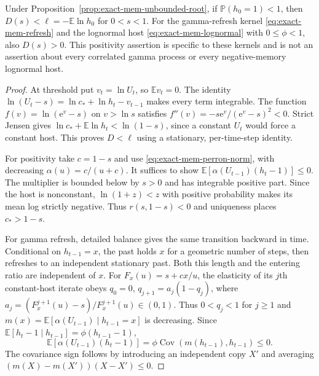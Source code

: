 \begin{proposition}
\label{prop:exact-mem-unbounded-bounds}
Under Proposition~\ref{prop:exact-mem-unbounded-root}, if
$\mathbb P(h_0=1)<1$, then $D(s)<\ell=-\mathbb E\ln h_0$ for
$0<s<1$. For the gamma-refresh kernel \eqref{eq:exact-mem-refresh}
and the lognormal host \eqref{eq:exact-mem-lognormal} with
$0\leq\phi<1$, also $D(s)>0$. This positivity assertion is specific
to these kernels and is not an assertion about every correlated
gamma process or every negative-memory lognormal host.
\end{proposition}

\begin{proof}
At threshold put $v_t=\ln U_t$, so $\mathbb E v_t=0$. The identity
$\ln(U_t-s)=\ln c_*+\ln h_t-v_{t-1}$ makes every term integrable.
The function $f(v)=\ln(\mathrm e^v-s)$ on $v>\ln s$ satisfies
$f''(v)=-s\mathrm e^v/(\mathrm e^v-s)^2<0$.
Strict Jensen gives $\ln c_*+\mathbb E\ln h_t<\ln(1-s)$,
since a constant $U_t$ would force a constant host. This proves
$D<\ell$ using a stationary, per-time-step identity.

For positivity take $c=1-s$ and use
\eqref{eq:exact-mem-perron-norm}, with decreasing
$\alpha(u)=c/(u+c)$. It suffices to show
$\mathbb E[\alpha(U_{t-1})(h_t-1)]\leq0$.
The multiplier is bounded below by $s>0$ and has integrable positive
part. Since the host is nonconstant, $\ln(1+z)<z$ with positive
probability makes its mean log strictly negative. Thus
$r(s,1-s)<0$ and uniqueness places $c_*>1-s$.

For gamma refresh, detailed balance gives the same transition
backward in time. Conditional on $h_{t-1}=x$, the past holds $x$
for a geometric number of steps, then refreshes to an independent
stationary past. Both this length and the entering ratio are
independent of $x$. For $F_x(u)=s+cx/u$, the elasticity of its
$j$th constant-host iterate obeys
$q_0=0$, $q_{j+1}=a_j(1-q_j)$, where
$a_j=(F_x^{j+1}(u)-s)/F_x^{j+1}(u)\in(0,1)$.
Thus $0<q_j<1$ for $j\geq1$ and
$m(x)=\mathbb E[\alpha(U_{t-1})\mid h_{t-1}=x]$ is decreasing.
Since $\mathbb E[h_t-1\mid h_{t-1}]=\phi(h_{t-1}-1)$,
\begin{equation}
 \mathbb E[\alpha(U_{t-1})(h_t-1)]
 =\phi\operatorname{Cov}(m(h_{t-1}),h_{t-1})\leq0.
 \label{eq:exact-mem-refresh-order}
\end{equation}
The covariance sign follows by introducing an independent copy $X'$
and averaging $(m(X)-m(X'))(X-X')\leq0$.


\end{proof}
